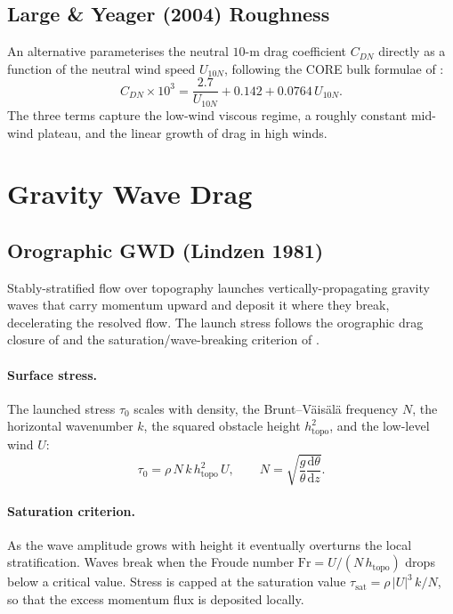 \documentclass[11pt,twoside]{report}
\newcommand{\dd}{\mathrm{d}}
\begin{document}
\subsection{Large \& Yeager (2004) Roughness}

An alternative parameterises the neutral $10$-m drag coefficient $C_{DN}$
directly as a function of the neutral wind speed $U_{10N}$, following the CORE
bulk formulae of \citet{LargeYeager2004}:
\begin{equation}
  C_{DN}\times10^3 = \frac{2.7}{U_{10N}}+0.142+0.0764\,U_{10N}.
\end{equation}
The three terms capture the low-wind viscous regime, a roughly constant
mid-wind plateau, and the linear growth of drag in high winds.


\section{Gravity Wave Drag}
\label{sec:gwd}

\subsection{Orographic GWD (Lindzen 1981)}

Stably-stratified flow over topography launches vertically-propagating gravity
waves that carry momentum upward and deposit it where they break, decelerating
the resolved flow. The launch stress follows the orographic drag closure of
\citet{McFarlane1987} and the saturation/wave-breaking criterion of
\citet{Lindzen1981}.

\paragraph{Surface stress.}
The launched stress $\tau_0$ scales with density, the Brunt--V\"ais\"al\"a
frequency $N$, the horizontal wavenumber $k$, the squared obstacle height
$h_{\mathrm{topo}}^2$, and the low-level wind $U$:
\begin{equation}
  \tau_0 = \rho\,N\,k\,h_{\mathrm{topo}}^2\,U,
  \qquad N = \sqrt{\frac{g}{\theta}\frac{\dd\theta}{\dd z}}.
\end{equation}

\paragraph{Saturation criterion.}
As the wave amplitude grows with height it eventually overturns the local
stratification. Waves break when the Froude number
$\mathrm{Fr}=U/(N\,h_{\mathrm{topo}})$ drops below a critical value.  Stress is
capped at the saturation value $\tau_{\mathrm{sat}}=\rho\,|U|^3\,k/N$, so that
the excess momentum flux is deposited locally.
\end{document}
